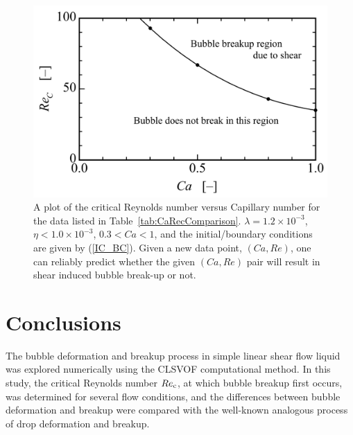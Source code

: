 \documentclass[%
 reprint,
 showkeys,
 amsmath,amssymb,
 aps,
 prfluids,
 onecolumn
]{revtex4-2}
\begin{document}
\begin{figure}%
  \centering
  \includegraphics[width=\textwidth]{Fig11-Critical-Re1_cubic}
  \caption{A plot of the critical Reynolds number versus Capillary number
	for the data listed in Table~\ref{tab:CaRecComparison}.  
	$\lambda = 1.2 \times 10^{-3}$, $\eta < 1.0 \times 10^{-3}$, $0.3<Ca<1$, and
        the initial/boundary conditions are given by (\ref{IC_BC}).
	Given a new data point, $(Ca,Re)$, one
	can reliably predict whether the 
	given $(Ca,Re)$ pair will result in shear
	induced bubble break-up or not.  
	   }
  \label{fig:CaRecFit}
\end{figure}
%

\section{Conclusions}
The bubble deformation and breakup process in simple linear shear flow liquid
was explored numerically using the CLSVOF computational method.  In this study,
the critical Reynolds number $Re_{\rm c}$, at which bubble breakup first occurs,
was determined for several flow conditions, and the differences between bubble
deformation and breakup were compared with the well-known analogous process of
drop deformation and breakup.
\end{document}
